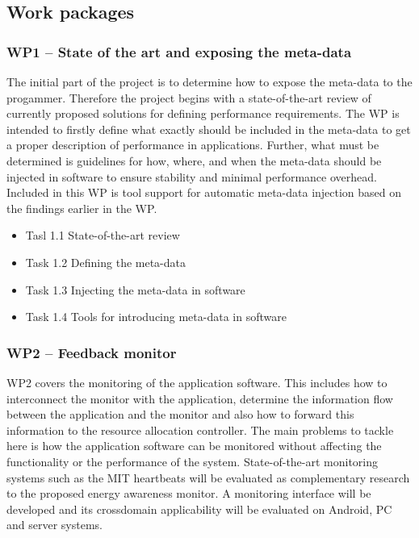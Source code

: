 \documentclass{article}
\begin{document}

\subsection{Work packages}
\subsubsection{WP1 -- State of the art and exposing the meta-data}
The initial part of the project is to determine how to expose the meta-data to the progammer.
Therefore the project begins with a state-of-the-art review of currently proposed solutions for defining performance requirements.
The WP is intended to firstly define what exactly should be included in the meta-data to get a proper description of performance in applications. 
Further, what must be determined is guidelines for how, where, and when the meta-data should be injected in software to ensure stability and minimal performance overhead.
Included in this WP is tool support for automatic meta-data injection based on the findings earlier in the WP.
\begin{itemize}
 \item Tasl 1.1 State-of-the-art review \vspace{-0.3cm}
 \item Task 1.2 Defining the meta-data \vspace{-0.3cm}
 \item Task 1.3 Injecting the meta-data in software \vspace{-0.3cm}
 \item Task 1.4 Tools for introducing meta-data in software \vspace{-0.3cm}
\end{itemize}

\subsubsection{WP2 -- Feedback monitor}
WP2 covers the monitoring of the application software.
This includes how to interconnect the monitor with the application, determine the information flow between the application and the monitor and also how to forward this information to the resource allocation controller.
The main problems to tackle here is how the application software can be monitored without affecting the functionality or the performance of the system.
State-of-the-art monitoring systems such as the MIT heartbeats \cite{Hoffmann:10} will be evaluated as complementary research to the proposed energy awareness monitor.
A monitoring interface will be developed and its crossdomain applicability will be evaluated on Android, PC and server systems.
\end{document}
